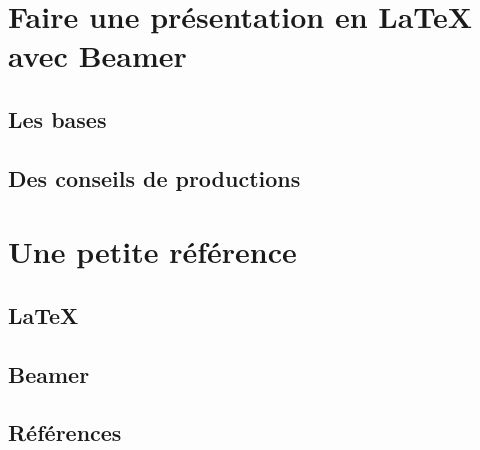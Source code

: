 \documentclass[aspectratio=169,10pt,t]{beamer}
\begin{document}

\section{Faire une présentation en \LaTeX{} avec Beamer}


\subsection{Les bases}


\subsection{Des conseils de productions}



\section{Une petite référence}


\subsection{\LaTeX{}}


\subsection{Beamer}


\subsection{Références}



\end{document}
